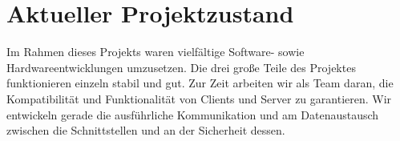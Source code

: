
\chapter{Aktueller Projektzustand}
Im Rahmen dieses Projekts waren vielfältige Software- sowie Hardwareentwicklungen umzusetzen. Die drei große Teile des Projektes funktionieren einzeln stabil und gut. Zur Zeit arbeiten wir als Team daran, die Kompatibilität und Funktionalität von Clients und Server zu garantieren. Wir entwickeln gerade die ausführliche Kommunikation und am Datenaustausch zwischen die Schnittstellen und an der Sicherheit dessen.